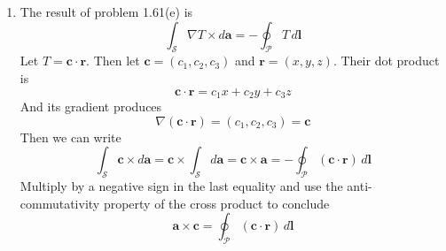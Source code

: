 \documentclass[a4paper]{article}
\begin{document}
\begin{enumerate}[label=(\alph*)]
\begin{center}
\begin{tikzpicture}[scale=1.6,>=Stealth]
	\end{tikzpicture}
	\end{center}
	Geometrically, the magnitude of the cross product represents the area of the parallelogram spanned by the two vectors. In this case, we deal with triangular wedges, producing the \( 1 / 2 \) factor. The triangle, per the diagram, is spanned by \( \pmb{r} \) and \( \pmb{r} + d\pmb{l} \), from which we calculate
	\[
		d \pmb{a} = \frac{1}{2} \pmb{r} \times \!\left( \pmb{r} + d \pmb{l} \right) = \frac{1}{2} \!\left( \pmb{r} \times \pmb{r} + \pmb{r} \times d \pmb{l} \right) = \frac{1}{2}\pmb{r} \times d \pmb{l}
	\]
	which represents the infinitesimal vector area of an arbitrary triangular wedges; summing all such \( d \pmb{a} \)'s produces
	\[
		\pmb{a} = \frac{1}{2}\oint \pmb{r} \times d \pmb{l} 
	\]
	which is true for \textbf{all} surfaces sharing the loop per part (c).
	\item The result of problem 1.61(e) is
	\[
		\int_{\mathcal{S}} \nabla T \times d \pmb{a} = -\oint_{\mathcal{P}} T \, d \pmb{l} 
	\]
	Let \( T = \pmb{c} \cdot \pmb{r} \). Then let \( \pmb{c} = \!\left( c_{1},c_{2},c_{3} \right) \) and \( \pmb{r} = \!\left( x,y,z \right) \). Their dot product is
	\[
		\pmb{c} \cdot \pmb{r} = c_{1}x + c_{2}y + c_{3}z 
	\]
	And its gradient produces
	\[
		\nabla \!\left( \pmb{c} \cdot \pmb{r} \right) = \!\left( c_{1},c_{2},c_{3} \right) = \pmb{c} 
	\]
	Then we can write
	\[
		\int_{\mathcal{S}}\pmb{c} \times d \pmb{a} = \pmb{c} \times \int_{\mathcal{S}}d \pmb{a} = \pmb{c} \times \pmb{a} = -\oint_{\mathcal{P}}\!\left( \pmb{c} \cdot \pmb{r} \right) \, d \pmb{l} 
	\]
	Multiply by a negative sign in the last equality and use the anti-commutativity property of the cross product to conclude
	\[
		\pmb{a} \times \pmb{c} = \oint_{\mathcal{P}} \!\left( \pmb{c} \cdot \pmb{r} \right) \, d \pmb{l} 
	\]
\end{enumerate}

\end{document}
